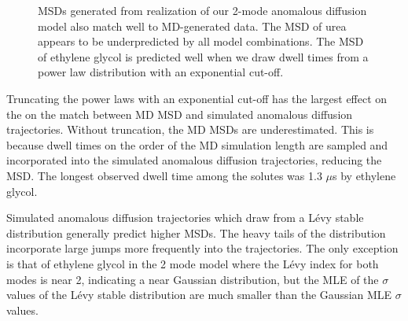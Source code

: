 \documentclass{article}
\begin{document}
\begin{figure}
  \caption{MSDs generated from realization of our 2-mode anomalous diffusion model
  also match well to MD-generated data. The MSD of urea appears to be underpredicted
  by all model combinations. The MSD of ethylene glycol is predicted well when 
  we draw dwell times from a power law distribution with an exponential cut-off.}\label{fig:anomalous_msds_2mode}
  \end{figure}
  
  Truncating the power laws with an exponential cut-off has the largest effect on the on 
  the match between MD MSD and simulated anomalous diffusion trajectories. Without 
  truncation, the MD MSDs are underestimated. This is because dwell times on the order 
  of the MD simulation length are sampled and incorporated into the simulated anomalous
  diffusion trajectories, reducing the MSD. The longest observed dwell time among the
  solutes was 1.3 $\mu$s by ethylene glycol.
  
  Simulated anomalous diffusion trajectories which draw from a L\'evy stable distribution
  generally predict higher MSDs. The heavy tails of the distribution incorporate large
  jumps more frequently into the trajectories. The only exception is that of ethylene
  glycol in the 2 mode model where the L\'evy index for both modes is near 2, indicating
  a near Gaussian distribution, but the MLE of the $\sigma$ values of the L\'evy stable
  distribution are much smaller than the Gaussian MLE $\sigma$ values.
    
\end{document}
